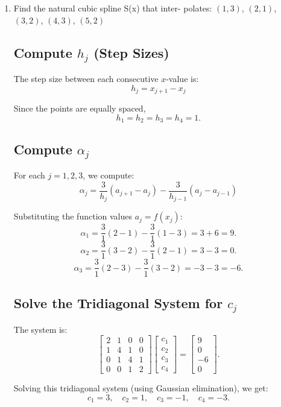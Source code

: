 \documentclass[12pt]{article}
\begin{document}
\begin{enumerate}[leftmargin=2em]
    \item
Find the natural cubic spline S(x) that inter-
polates:
\((1,3)\), \((2,1)\), \((3,2)\), \((4,3)\), \((5,2)\) 

\subsection*{Compute \( h_j \) (Step Sizes)}

The step size between each consecutive \( x \)-value is:
\[
h_j = x_{j+1} - x_j
\]

Since the points are equally spaced,
\[
h_1 = h_2 = h_3 = h_4 = 1.
\]

\subsection*{Compute \( \alpha_j \)}

For each \( j = 1, 2, 3 \), we compute:
\[
\alpha_j = \frac{3}{h_j}(a_{j+1} - a_j) - \frac{3}{h_{j-1}}(a_j - a_{j-1})
\]

Substituting the function values \( a_j = f(x_j) \):
\[
\alpha_1 = \frac{3}{1}(2 - 1) - \frac{3}{1}(1 - 3) = 3 + 6 = 9.
\]
\[
\alpha_2 = \frac{3}{1}(3 - 2) - \frac{3}{1}(2 - 1) = 3 - 3 = 0.
\]
\[
\alpha_3 = \frac{3}{1}(2 - 3) - \frac{3}{1}(3 - 2) = -3 - 3 = -6.
\]

\subsection*{Solve the Tridiagonal System for \( c_j \)}

The system is:
\[
\begin{bmatrix}
2 & 1 & 0 & 0 \\
1 & 4 & 1 & 0 \\
0 & 1 & 4 & 1 \\
0 & 0 & 1 & 2
\end{bmatrix}
\begin{bmatrix}
c_1 \\
c_2 \\
c_3 \\
c_4
\end{bmatrix}
=
\begin{bmatrix}
9 \\
0 \\
-6 \\
0
\end{bmatrix}.
\]

Solving this tridiagonal system (using Gaussian elimination), we get:
\[
c_1 = 3, \quad c_2 = 1, \quad c_3 = -1, \quad c_4 = -3.
\]


\end{enumerate}
\end{document}
